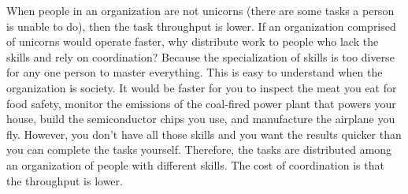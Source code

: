 When people in an organization are not unicorns (there are some tasks a person is unable to do), then the task throughput is lower. If an organization comprised of unicorns would operate faster, why distribute work to people who lack the skills and rely on coordination?
Because the specialization of skills is too diverse for any one person to master everything. This is easy to understand when the organization is society. It would be faster for you to 
 inspect the meat you eat for food safety, monitor the emissions of the coal-fired power plant that powers your house, build the semiconductor chips you use, and manufacture the airplane you fly. However, you don't have all those skills and you want the results quicker than you can complete the tasks yourself. Therefore, the tasks are distributed among an organization of people with different skills. The cost of coordination is that the throughput is lower.








